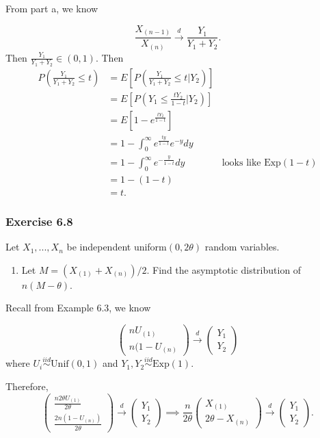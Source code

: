 \documentclass[12pt,]{article}
\providecommand{\tightlist}{%
  \setlength{\itemsep}{0pt}\setlength{\parskip}{0pt}}
\begin{document}
From part a, we know

\[\frac{X_{(n-1)}}{X_{(n)}}\overset{d}\rightarrow \frac{Y_1}{Y_1+Y_2}.\]
Then \(\frac{Y_1}{Y_1+Y_2}\in(0,1).\) Then \begin{align*}
P\left(\frac{Y_1}{Y_1+Y_2} \le t \right) & = E\left[P\left(\frac{Y_1}{Y_1+Y_2} \le t |Y_2 \right)\right]\\
& = E\left[P\left(Y_1 \le \frac{tY_2}{1-t} |Y_2 \right)\right]\\
& = E\left[1 -  e^{\frac{tY_2}{1-t}}\right]\\
& = 1 - \int_0^\infty e^{\frac{ty}{1-t}}e^{-y} dy\\
& = 1 - \int_0^\infty e^{-\frac{y}{1-t}} dy & \text{looks like Exp}(1-t)\\
& = 1 - (1-t)\\
& = t.
\end{align*}

\hypertarget{exercise-6.8}{%
\subsubsection{Exercise 6.8}\label{exercise-6.8}}

Let \(X_1,...,X_n\) be independent uniform\((0,2\theta)\) random
variables.

\begin{enumerate}
\def\labelenumi{(\alph{enumi})}
\tightlist
\item
  Let \(M=(X_{(1)}+X_{(n)})/2.\) Find the asymptotic distribution of
  \(n(M-\theta)\).
\end{enumerate}

Recall from Example 6.3, we know

\[\begin{pmatrix}nU_{(1)} \\ n(1-U_{(n)}\end{pmatrix}\overset{d}\rightarrow \begin{pmatrix}Y_1 \\ Y_2\end{pmatrix}\]
where \(U_i \overset{iid}\sim \text{Unif}(0,1)\) and
\(Y_1, Y_2 \overset{iid}\sim \text{Exp}(1).\)

Therefore,
\[\begin{pmatrix} \frac{n2\theta U_{(1)}}{2\theta} \\ \frac{2n(1-U_{(n)})}{2\theta}\end{pmatrix}\overset{d}\rightarrow \begin{pmatrix}Y_1 \\ Y_2\end{pmatrix} \implies \frac{n}{2\theta}\begin{pmatrix} X_{(1)} \\ 2\theta - X_{(n)}\end{pmatrix}\overset{d}\rightarrow \begin{pmatrix}Y_1 \\ Y_2\end{pmatrix}.\]
\end{document}
